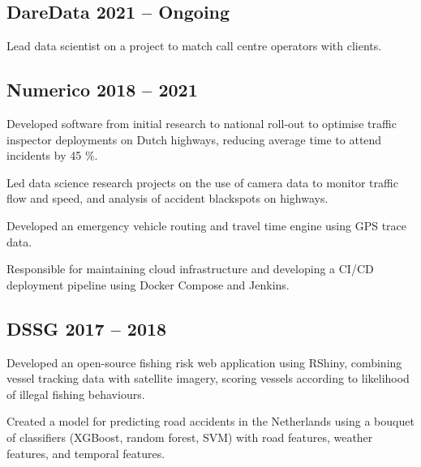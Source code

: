 \subsection{DareData \hfill 2021 -- Ongoing}
    \begin{list2}
        \item Lead data scientist on a project to match call centre operators with clients.
    \end{list2}

\subsection{Numerico \hfill 2018 -- 2021}
    \begin{list2}
        \item Developed software from initial research to national roll-out to optimise traffic inspector deployments on Dutch highways, reducing average time to attend incidents by 45 \%.
        \item Led data science research projects on the use of camera data to monitor traffic flow and speed, and analysis of accident blackspots on highways.
        \item Developed an emergency vehicle routing and travel time engine using GPS trace data.
        \item Responsible for maintaining cloud infrastructure and developing a CI/CD deployment pipeline using Docker Compose and Jenkins.
    \end{list2}

\subsection{DSSG \hfill 2017 -- 2018}
    \begin{list2}
        \item Developed an open-source fishing risk web application using RShiny, combining vessel tracking data with satellite imagery, scoring vessels according to likelihood of illegal fishing behaviours.
        \item Created a model for predicting road accidents in the Netherlands using a bouquet of classifiers (XGBoost, random forest, SVM) with road features, weather features, and temporal features.
    \end{list2}

